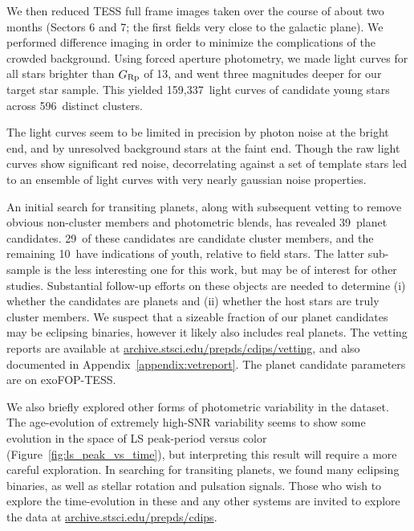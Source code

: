 \documentclass[12pt,twocolumn,tighten]{aastex62}
\newcommand{\numberpcs}{39\ }  %
\newcommand{\numberzaripcs}{10\ }  %
\newcommand{\numberclusterpcs}{29\ }  %
\newcommand{\numberlcs}{159{,}337\ } %
\newcommand{\numberclusters}{596\ } %
\newcommand{\stscilink}{\url{archive.stsci.edu/prepds/cdips}}
\newcommand{\stscivetlink}{\url{archive.stsci.edu/prepds/cdips/vetting}}
\begin{document}
We then reduced TESS full frame images taken over the course of about
two months (Sectors 6 and 7; the first fields very close to the galactic
plane).
We performed difference imaging in order to minimize the complications
of the crowded background.
Using forced aperture photometry, we made light curves for all stars
brighter than $G_{\rm Rp}$ of 13, and went three magnitudes deeper for
our target star sample.
This yielded \numberlcs light curves of candidate young stars across
\numberclusters distinct clusters.

The light curves seem to be limited in precision by photon noise at
the bright end, and by unresolved background stars at the faint end.
Though the raw light curves show significant red noise, decorrelating
against a set of template stars led to an ensemble of light curves
with very nearly gaussian noise properties.

An initial search for transiting planets, along with subsequent
vetting to remove obvious non-cluster members and photometric blends,
has revealed \numberpcs planet candidates.
\numberclusterpcs of these candidates are candidate cluster members,
and the remaining \numberzaripcs have indications of youth, relative
to field stars.
The latter sub-sample is the less interesting one for this work, but
may be of interest for other studies.
Substantial follow-up efforts on these objects are needed to determine
(i) whether the candidates are planets and (ii) whether the host stars
are truly cluster members.
We suspect that a sizeable fraction of our planet candidates may
be eclipsing binaries, however it likely also includes real planets.
The vetting reports are available at \stscivetlink, and also documented
in Appendix~\ref{appendix:vetreport}.
The planet candidate parameters are on exoFOP-TESS.

We also briefly explored other forms of photometric variability in the
dataset.
The age-evolution of extremely high-SNR variability seems to show some
evolution in the space of LS peak-period versus color
(Figure~\ref{fig:ls_peak_vs_time}), but interpreting this result will
require a more careful exploration.
In searching for transiting planets, we found many eclipsing binaries,
as well as stellar rotation and pulsation signals.
Those who wish to explore the time-evolution in these and any other
systems are invited to explore the data at \stscilink.
\end{document}
